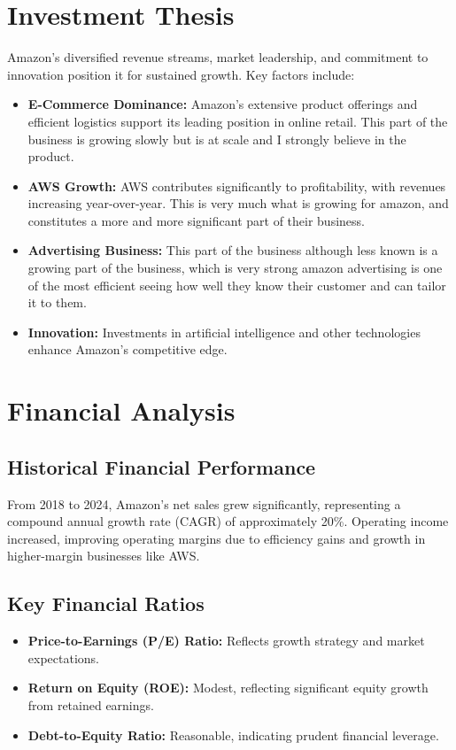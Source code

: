 \documentclass[12pt]{report}
\begin{document}
\section{Investment Thesis}
Amazon's diversified revenue streams, market leadership, and commitment to innovation position it for sustained growth. Key factors include:

\begin{itemize}
    \item \textbf{E-Commerce Dominance:} Amazon's extensive product offerings and efficient logistics support its leading position in online retail. This part of the business is growing slowly but is at scale and I strongly believe in the product.
    \item \textbf{AWS Growth:} AWS contributes significantly to profitability, with revenues increasing year-over-year. This is very much what is growing for amazon, and constitutes a more and more significant part of their business.
    \item \textbf{Advertising Business:} This part of the business although less known is a growing part of the business, which is very strong amazon advertising is one of the most efficient seeing how well they know their customer and can tailor it to them.
    \item \textbf{Innovation:} Investments in artificial intelligence and other technologies enhance Amazon's competitive edge.
\end{itemize}

\section{Financial Analysis}
\subsection{Historical Financial Performance}
From 2018 to 2024, Amazon's net sales grew significantly, representing a compound annual growth rate (CAGR) of approximately 20\%. Operating income increased, improving operating margins due to efficiency gains and growth in higher-margin businesses like AWS.

\subsection{Key Financial Ratios}
\begin{itemize}
    \item \textbf{Price-to-Earnings (P/E) Ratio:} Reflects growth strategy and market expectations.
    \item \textbf{Return on Equity (ROE):} Modest, reflecting significant equity growth from retained earnings.
    \item \textbf{Debt-to-Equity Ratio:} Reasonable, indicating prudent financial leverage.
\end{itemize}
\end{document}
